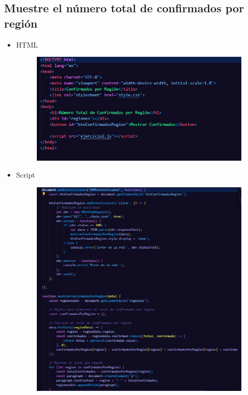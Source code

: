 \documentclass{article}
\begin{document}
	\subsection{Muestre el número total de confirmados por región}
	\begin{itemize}
		\item HTML
		\begin{figure}[H]
			\centering
			\includegraphics[width=1.0\textwidth,keepaspectratio]{img/Ejer2T2HTML.jpg}
		\end{figure}
		\item Script
		\begin{figure}[H]
			\centering
			\includegraphics[width=1.0\textwidth,keepaspectratio]{img/Ejer2T2Script.jpg}

\end{figure}
\end{itemize}
\end{document}
